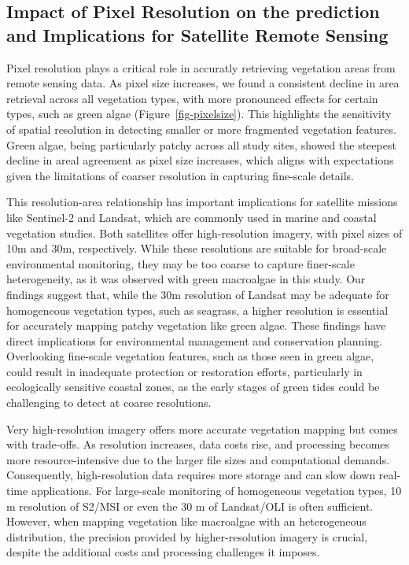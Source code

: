 \documentclass[
  number]{elsarticle}
\begin{document}
\subsection{Impact of Pixel Resolution on the prediction and
Implications for Satellite Remote
Sensing}\label{impact-of-pixel-resolution-on-the-prediction-and-implications-for-satellite-remote-sensing}

Pixel resolution plays a critical role in accuratly retrieving
vegetation areas from remote sensing data. As pixel size increases, we
found a consistent decline in area retrieval across all vegetation
types, with more pronounced effects for certain types, such as green
algae (Figure~\ref{fig-pixelsize}). This highlights the sensitivity of
spatial resolution in detecting smaller or more fragmented vegetation
features. Green algae, being particularly patchy across all study sites,
showed the steepest decline in areal agreement as pixel size increases,
which aligns with expectations given the limitations of coarser
resolution in capturing fine-scale details.

This resolution-area relationship has important implications for
satellite missions like Sentinel-2 and Landsat, which are commonly used
in marine and coastal vegetation studies. Both satellites offer
high-resolution imagery, with pixel sizes of 10m and 30m, respectively.
While these resolutions are suitable for broad-scale environmental
monitoring, they may be too coarse to capture finer-scale heterogeneity,
as it was observed with green macroalgae in this study. Our findings
suggest that, while the 30m resolution of Landsat may be adequate for
homogeneous vegetation types, such as seagrass, a higher resolution is
essential for accurately mapping patchy vegetation like green algae.
These findings have direct implications for environmental management and
conservation planning. Overlooking fine-scale vegetation features, such
as those seen in green algae, could result in inadequate protection or
restoration efforts, particularly in ecologically sensitive coastal
zones, as the early stages of green tides could be challenging to detect
at coarse resolutions.

Very high-resolution imagery offers more accurate vegetation mapping but
comes with trade-offs. As resolution increases, data costs rise, and
processing becomes more resource-intensive due to the larger file sizes
and computational demands. Consequently, high-resolution data requires
more storage and can slow down real-time applications. For large-scale
monitoring of homogeneous vegetation types, 10 m resolution of S2/MSI or
even the 30 m of Landsat/OLI is often sufficient. However, when mapping
vegetation like macroalgae with an heterogeneous distribution, the
precision provided by higher-resolution imagery is crucial, despite the
additional costs and processing challenges it imposes.
\end{document}
